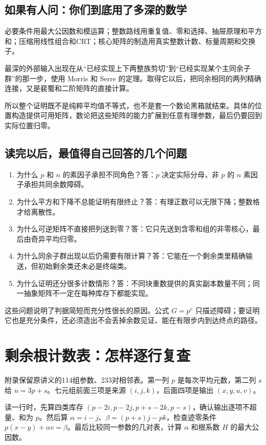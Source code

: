 \documentclass[11pt,a4paper,oneside,openany]{book}
\theoremstyle{definition}
\numberwithin{equation}{chapter}
\begin{document}
\section{如果有人问：你们到底用了多深的数学}
必要条件用最大公因数和模运算；整数路线用重复值、零和选择、抽屉原理和平方和；压缩用线性组合和CRT；核心矩阵的制造用真实整数计数、标量周期和交换子。

最深的外部输入出现在从“已经实现上下两整族剪切”到“已经实现某个主同余子群”的那一步，使用 Morris 和 Serre 的定理。取得它以后，把同余相同的两列精确连接，又是裴蜀和二阶矩阵的直接计算。

所以整个证明既不是纯粹平均值不等式，也不是套一个数论黑箱就结束。具体的位置构造提供可用矩阵，数论把这些矩阵的能力扩展到任意有理参数，最后仍要回到实际位置归零。

\section{读完以后，最值得自己回答的几个问题}
\begin{enumerate}
\item 为什么 $p$ 和 $n$ 的素因子承担不同角色？答：$p$ 决定实际分母，非 $p$ 的 $n$ 素因子承担共同余数障碍。
\item 为什么平方和下降不总能证明有限终止？答：有理正数可以无限下降；整数格才给离散性。
\item 为什么可逆矩阵不直接把列送到零？答：它只先送到含零和组的非零核心，最后由奇异平均归零。
\item 为什么同余子群出现以后仍需要有限计算？答：它能在一个剩余类里精确输送，但初始剩余类还未必是终端类。
\item 为什么证明还分很多计数情形？答：不同块重数提供的真实副本数量不同；同一抽象矩阵不一定在每种库存下都能实现。
\end{enumerate}
这些问题说明了判据简短而充分性很长的原因。公式 $G=p^e$ 只描述障碍；要证明它也是充分条件，还必须造出不会丢掉余数见证、能在有限步内到达终点的路径。

\appendix
\chapter{剩余根计数表：怎样逐行复查}\label{app:certificates}
附录保留原讲义的114组参数、233对相邻表。第一列 $p$ 是每次平均元数，第二列 $s$ 给 $n=3p+s$。七元组前面三项是来源 $(i,j,k)$，后面四项是输出 $(x,y,u,v)$。

读一行时，先算四类库存 $(p-2i,p-2j,p+s-2k,p-s)$，确认输出逐项不超量、和为 $p$。然后算 $\alpha=i-j$、$\beta=(p+s)j-pk$，检查迹零条件 $p(x-y)+\alpha v=\beta$。最后比较同一参数的几对表，计算 $\alpha$ 和根系数 $H$ 的最大公因数。
\end{document}
